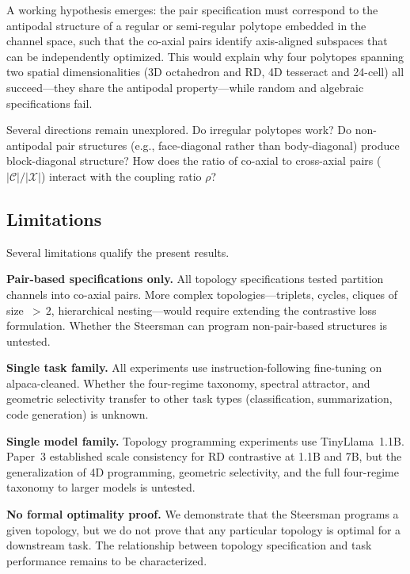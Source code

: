 A working hypothesis emerges: the pair specification must correspond to
the antipodal structure of a regular or semi-regular polytope
embedded in the channel space, such that the co-axial pairs identify
axis-aligned subspaces that can be independently optimized. This
would explain why four polytopes spanning two spatial dimensionalities
(3D octahedron and RD, 4D tesseract and 24-cell) all succeed---they
share the antipodal property---while random and algebraic specifications
fail.

Several directions remain unexplored. Do irregular polytopes work?
Do non-antipodal pair structures (e.g., face-diagonal rather than
body-diagonal) produce block-diagonal structure? How does the ratio
of co-axial to cross-axial pairs ($|\mathcal{C}|/|\mathcal{X}|$)
interact with the coupling ratio $\rho$?



\subsection{Limitations}
\label{sec:disc-limitations}

Several limitations qualify the present results.

\textbf{Pair-based specifications only.}
All topology specifications tested partition channels into co-axial
pairs. More complex topologies---triplets, cycles, cliques of
size~${>}\,2$, hierarchical nesting---would require extending the
contrastive loss formulation. Whether the Steersman can program
non-pair-based structures is untested.

\textbf{Single task family.}
All experiments use instruction-following fine-tuning on
alpaca-cleaned. Whether the four-regime taxonomy, spectral attractor,
and geometric selectivity transfer to other task types
(classification, summarization, code generation) is unknown.

\textbf{Single model family.}
Topology programming experiments use TinyLlama~1.1B. Paper~3
established scale consistency for RD contrastive at 1.1B and 7B, but
the generalization of 4D programming, geometric selectivity, and the
full four-regime taxonomy to larger models is untested.

\textbf{No formal optimality proof.}
We demonstrate that the Steersman programs a given topology, but we
do not prove that any particular topology is optimal for a downstream
task. The relationship between topology specification and task
performance remains to be characterized.

